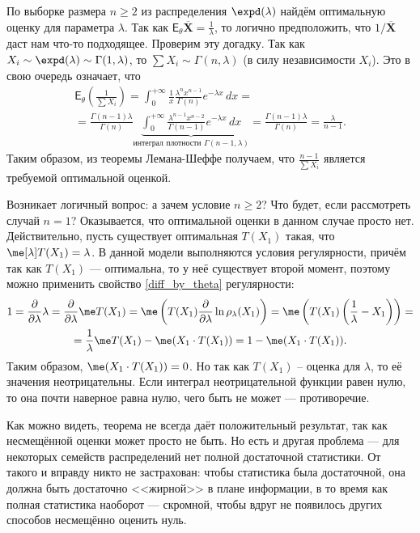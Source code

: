\begin{example}
    По выборке размера $n \ge 2$ из распределения $\expd(\lambda)$ найдём оптимальную оценку для параметра $\lambda$. Так как $\mathsf E_{\theta} \overline{\mathbf X} = \frac{1}{\lambda}$, то логично предположить, что $1 / \overline{\mathbf X}$ даст нам что-то подходящее. Проверим эту догадку. Так как $X_i \sim \expd(\lambda) \sim \Gamma(1, \lambda)$, то $\sum X_i \sim \Gamma(n, \lambda)$ (в силу независимости $X_i$). Это в свою очередь означает, что
    \begin{gather*}
    	\mathsf E_{\theta} \left(\frac{1}{\sum X_i}\right) = \int_0^{+\infty} \frac{1}{x} \frac{\lambda^n x^{n-1}}{\Gamma(n)}e^{-\lambda x}\,dx = \\
    	= \frac{\Gamma(n-1)\lambda}{\Gamma(n)} \underbrace{\int_0^{+\infty} \frac{\lambda^{n-1} x^{n-2}}{\Gamma(n-1)}e^{-\lambda x}\,dx}_{\text{интеграл плотности $\Gamma(n-1,\lambda)$}} = \frac{\Gamma(n-1)\lambda}{\Gamma(n)} = \frac{\lambda}{n-1}.
    \end{gather*}
    Таким образом, из теоремы Лемана-Шеффе получаем, что $\frac{n-1}{\sum X_i}$ является требуемой оптимальной оценкой.

    Возникает логичный вопрос: а зачем условие $n \ge 2$? Что будет, если рассмотреть случай $n=1$? Оказывается, что оптимальной оценки в данном случае просто нет. Действительно, пусть существует оптимальная $T(X_1)$ такая, что $\me[\lambda] T(X_1) = \lambda$. В данной модели выполняются условия регулярности, причём так как $T(X_1)$ --- оптимальна, то у неё существует второй момент, поэтому можно применить свойство \ref{diff_by_theta} регулярности:
    \begin{gather*}
    1 = \frac{\partial}{\partial \lambda} \lambda = \frac{\partial}{\partial \lambda} \me T(X_1) = \me\left( T(X_1) \frac{\partial}{\partial \lambda} \ln{\rho_{\lambda}(X_1)}\right) = \me\left(T(X_1) \left(\frac{1}{\lambda} - X_1\right)\right) =\\
    = \frac{1}{\lambda} \me T(X_1) - \me (X_1 \cdot T(X_1)) = 1 - \me (X_1 \cdot T(X_1)).
    \end{gather*}
    Таким образом, $\me (X_1 \cdot T(X_1)) = 0$. Но так как $T(X_1)$ -- оценка для $\lambda$, то её значения неотрицательны. Если интеграл неотрицательной функции равен нулю, то она почти наверное равна нулю, чего быть не может --- противоречие.
\end{example}

Как можно видеть, теорема не всегда даёт положительный результат, так как несмещённой оценки может просто не быть. Но есть и другая проблема --- для некоторых семейств распределений нет полной достаточной статистики. От такого и вправду никто не застрахован: чтобы статистика была достаточной, она должна быть достаточно <<жирной>> в плане информации, в то время как полная статистика наоборот --- скромной, чтобы вдруг не появилось других способов несмещённо оценить нуль.

